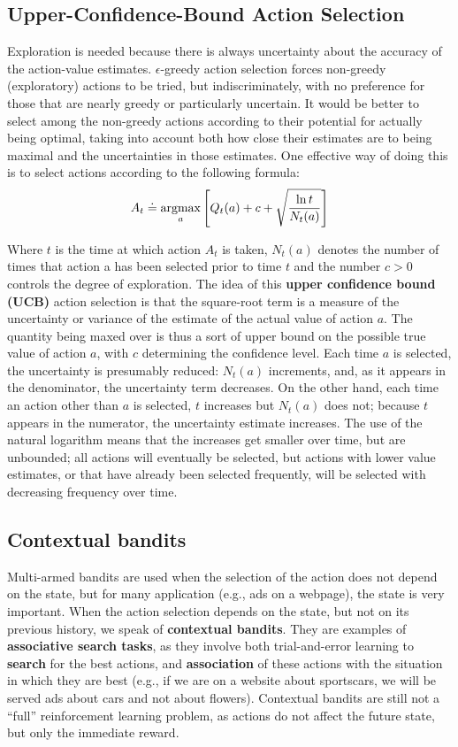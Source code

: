 \subsection{Upper-Confidence-Bound Action Selection}
Exploration is needed because there is always uncertainty about the accuracy of the action-value estimates. $\epsilon$-greedy action selection forces non-greedy (exploratory) actions to be tried, but indiscriminately, with no preference for those that are nearly greedy or particularly uncertain. It would be better to select among the non-greedy actions according to their potential for actually being optimal, taking into account both how close their estimates are to being maximal and the uncertainties in those estimates. One effective way of doing this is to select actions according to the following formula:
\begin{equation}
    A_t \doteq \operatorname*{argmax}_a \Bigg[ Q_t (a) + c + \sqrt{\frac{\ln{t}}{N_t (a)}} \Bigg]
    \label{eq:ch3-upperconfidenceboundactionselection}
\end{equation}

Where $t$ is the time at which action $A_t$ is taken, $N_t (a)$ denotes the number of times that action a has been selected prior to time $t$ and the number $c > 0$ controls the degree of exploration. The idea of this \textbf{upper confidence bound (UCB)} action selection is that the square-root term is a measure of the uncertainty or variance of the estimate of the actual value of action $a$. The quantity being maxed over is thus a sort of upper bound on the possible true value of action $a$, with $c$ determining the confidence level. Each time $a$ is selected, the uncertainty is presumably reduced: $N_t (a)$ increments, and, as it appears in the denominator, the uncertainty term decreases. On the other hand, each time an action other than $a$ is selected, $t$ increases but $N_t (a)$ does not; because $t$ appears in the numerator, the uncertainty estimate increases. The use of the natural logarithm means that the increases get smaller over time, but are unbounded; all actions will eventually be selected, but actions with lower value estimates, or that have already been selected frequently, will be selected with decreasing frequency over time.

\subsection{Contextual bandits}
Multi-armed bandits are used when the selection of the action does not depend on the state, but for many application (e.g., ads on a webpage), the state is very important. When the action selection depends on the state, but not on its previous history, we speak of \textbf{contextual bandits}. They are examples of \textbf{associative search tasks}, as they involve both trial-and-error learning to \textbf{search} for the best actions, and \textbf{association} of these actions with the situation in which they are best (e.g., if we are on a website about sportscars, we will be served ads about cars and not about flowers). Contextual bandits are still not a ``full'' reinforcement learning problem, as actions do not affect the future state, but only the immediate reward.